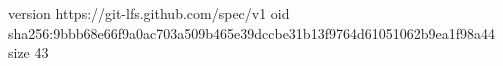 version https://git-lfs.github.com/spec/v1
oid sha256:9bbb68e66f9a0ac703a509b465e39dccbe31b13f9764d61051062b9ea1f98a44
size 43
